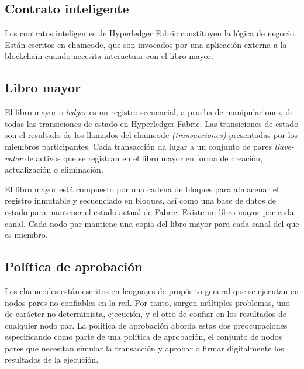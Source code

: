 \subsection{Contrato inteligente}
Los contratos inteligentes de Hyperledger Fabric constituyen la l\'ogica de negocio. Est\'an escritos en chaincode, que son invocados por una aplicaci\'on externa a la blockchain cuando necesita interactuar con el libro mayor.


\subsection{Libro mayor}
El libro mayor o \emph{ledger} es un registro secuencial, a prueba de manipulaciones, de todas las transiciones de estado en Hyperledger Fabric. Las transiciones de estado son el resultado de los llamados del chaincode \emph{(transacciones)} presentadas por los miembros participantes. Cada transacci\'on da lugar a un conjunto de pares \emph{llave-valor} de activos que se registran en el libro mayor en forma de creaci\'on, actualizaci\'on o eliminaci\'on.

El libro mayor est\'a compuesto por una cadena de bloques para almacenar el registro inmutable y secuenciado en bloques, as\'i como una base de datos de estado para mantener el estado actual de Fabric. Existe un libro mayor por cada canal. Cada nodo par mantiene una copia del libro mayor para cada canal del que es miembro.

\subsection{Pol\'itica de aprobaci\'on}
Los chaincodes est\'an escritos en lenguajes de prop\'osito general que se ejecutan en nodos pares no confiables en la red. Por tanto, surgen m\'ultiples problemas, uno de car\'acter no determinista, ejecuci\'on, y el otro de confiar en los resultados de cualquier nodo par. La pol\'itica de aprobaci\'on aborda estas dos preocupaciones especificando como parte de una pol\'itica de aprobaci\'on, el conjunto de nodos pares que necesitan simular la transacci\'on y aprobar o firmar digitalmente los resultados de la ejecuci\'on.

